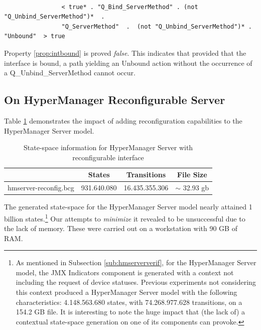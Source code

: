 	\begin{property}
	\label{prop:intbound}
		\begin{verbatim}
		
				< true* . "Q_Bind_ServerMethod" . (not "Q_Unbind_ServerMethod")*  . 
				"Q_ServerMethod"  .  (not "Q_Unbind_ServerMethod")* . "Unbound"  > true
		\end{verbatim}
	\end{property}
	
	\noindent Property \ref{prop:intbound} is proved \textit{false}. This indicates that provided that
	the interface is bound, a path yielding an \textsf{Unbound} action without the occurrence
	of a \textsf{Q\_Unbind\_ServerMethod} cannot occur.
		
	
	
\subsection{On HyperManager Reconfigurable Server}
\label{sub:hmrserververif}	

		
				
		Table \ref{tab:modelG3} demonstrates the impact of adding reconfiguration capabilities to the 
		\textsf{HyperManager Server} model.
		
\begin{table}[ht]
\begin{center}
\begin{tabular}{| l | c | c | c |}
\hline
                             &  \textbf{States} & \textbf{Transitions} & \textbf{File Size} \\
\hline

\textsf{hmserver-reconfig.bcg}                              & 931.640.080  &  16.435.355.306 &  $\sim$ 32.93 gb\\
 
  \hline
\end{tabular}
\end{center}
\caption{State-space information for \textsf{HyperManager Server} with reconfigurable interface}
\label{tab:modelG3}
\end{table}

	\vspace{-0.7cm}
	The generated state-space for the \textsf{HyperManager Server} model nearly attained 1 billion 
	states.\footnote{As mentioned in Subsection \ref{sub:hmserververif},
	 for the \textsf{HyperManager Server} model, the \textsf{JMX Indicators} component is generated with a context not including the
	 request of device statuses. Previous experiments not considering this context produced a \textsf{HyperManager Server} model 
	 with the following characteristics: 4.148.563.680 states, with 74.268.977.628 transitions, 
	 on a 154.2 GB file. It is interesting to note the huge impact that (the lack of) a contextual
	 state-space generation on one of its components can provoke.}
	Our attempts to \textit{minimize} it revealed to be unsuccessful due to the lack of memory.
	These were carried out on a workstation with 90 GB of RAM. 
	
